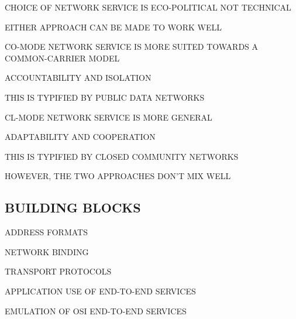 \begin{bwslide}

\begin{nrtc}
\item	CHOICE OF NETWORK SERVICE IS ECO-POLITICAL NOT TECHNICAL
    \begin{nrtc}
    \item	EITHER APPROACH CAN BE MADE TO WORK WELL
    \end{nrtc}

\item	CO-MODE NETWORK SERVICE IS MORE SUITED TOWARDS A COMMON-CARRIER MODEL
    \begin{nrtc}
    \item	ACCOUNTABILITY AND ISOLATION
    \end{nrtc}
    THIS IS TYPIFIED BY PUBLIC DATA NETWORKS

\item	CL-MODE NETWORK SERVICE IS MORE GENERAL
    \begin{nrtc}
    \item	ADAPTABILITY AND COOPERATION
    \end{nrtc}
    THIS IS TYPIFIED BY CLOSED COMMUNITY NETWORKS

\item	HOWEVER, THE TWO APPROACHES DON'T MIX WELL
\end{nrtc}
\end{bwslide}


\begin{bwslide}
\part	{BUILDING BLOCKS}\bf

\begin{nrtc}
\item	ADDRESS FORMATS

\item	NETWORK BINDING

\item	TRANSPORT PROTOCOLS

\item	APPLICATION USE OF END-TO-END SERVICES

\item	EMULATION OF OSI END-TO-END SERVICES
\end{nrtc}
\end{bwslide}


